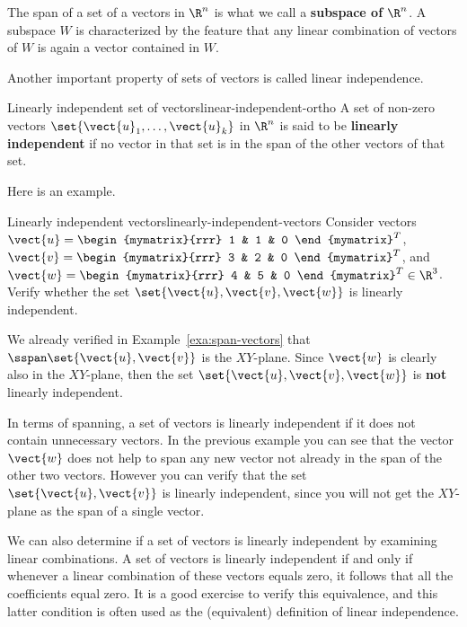 The span of a set of a vectors in $\R^n$ is what we call a \textbf{subspace of $\R^n$}. A subspace $W$ is characterized by the feature that any linear combination of vectors of $W$ is again a vector contained in $W$. 

Another important property of sets of vectors is called linear independence. 

\begin{definition}{Linearly independent set of vectors}{linear-independent-ortho}
A set of non-zero vectors $\set{\vect{u}_1,\ldots,\vect{u}_k}$ in $\R^{n}$ is said to be 
\textbf{linearly independent}
 if no vector in that set is in the span of the other vectors of that set.
\end{definition}

Here is an example.  

\begin{example}{Linearly independent vectors}{linearly-independent-vectors}
Consider vectors $\vect{u}=\begin{mymatrix}{rrr}
1  & 1 & 0
\end{mymatrix}^T$, 
$\vect{v}=\begin{mymatrix}{rrr}
3  & 2 & 0
\end{mymatrix}^T$, and
$\vect{w}=\begin{mymatrix}{rrr}
4  & 5 & 0
\end{mymatrix}^T  \in \R^{3}$.
Verify whether the set $\set{\vect{u}, \vect{v}, \vect{w}}$ is linearly independent. 
\end{example}

\begin{solution}
We already verified in Example~\ref{exa:span-vectors} that
$\sspan \set{\vect{u}, \vect{v}}$ is the $XY$-plane. Since $\vect{w}$
is clearly also in the $XY$-plane, then the set $\set{\vect{u}, \vect{v},
\vect{w}}$ is \textbf{not} linearly independent.
\end{solution}

In terms of spanning, a set of vectors is linearly independent if it
does not contain unnecessary vectors. In the previous example you
can see that the vector $\vect{w}$ does not help to span any new vector
not already in the span of the other two vectors. However you can
verify that the set $\set{\vect{u}, \vect{v}}$ is linearly independent,
since you will not get the $XY$-plane as the span of a single vector.

We can also determine if a set of vectors is linearly independent by examining linear combinations. A set of vectors is linearly independent if and only if
whenever a linear combination of these vectors equals zero, it follows
that all the coefficients equal zero. It is a good exercise to verify
this equivalence, and this latter condition is often used as the
(equivalent) definition of linear independence.

